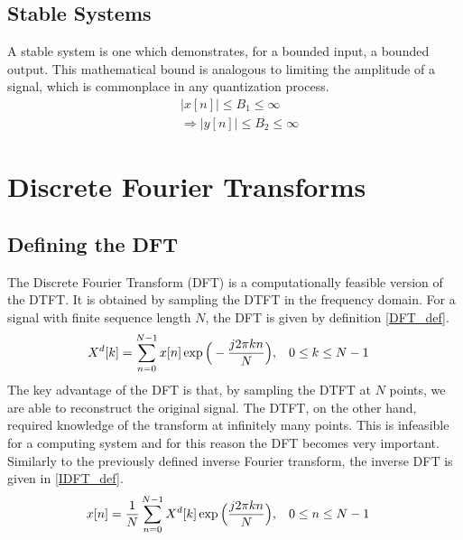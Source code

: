 \subsection{Stable Systems}
A stable system is one which demonstrates, for a bounded input, a bounded output. This mathematical bound is analogous to limiting the amplitude of a signal, which is commonplace in any quantization process.
\begin{align*}
& |x[n]| \leq B_1 \leq \infty \\
&\Longrightarrow |y[n]| \leq B_2 \leq \infty
\end{align*}


\section{Discrete Fourier Transforms}
\subsection{Defining the DFT}
The Discrete Fourier Transform (DFT) is a computationally feasible version of the DTFT. It is obtained by sampling the DTFT in the frequency domain. For a signal with finite sequence length $N$, the DFT is given by definition \ref{DFT_def}.
\begin{align}\label{DFT_def}
    X^d[k]  &= \sum_{n=0}^{N-1}x[n]\exp{\Big( -\dfrac{j2\pi kn}{N} \Big)}, \hspace{3mm} 0\leq k \leq N-1
\end{align}
The key advantage of the DFT is that, by sampling the DTFT at $N$ points, we are able to reconstruct the original signal. The DTFT, on the other hand, required knowledge of the transform at infinitely many points. This is infeasible for a computing system and for this reason the DFT becomes very important. Similarly to the previously defined inverse Fourier transform, the inverse DFT is given in \ref{IDFT_def}.
\begin{align}\label{IDFT_def}
    x[n]  &= \dfrac{1}{N} \sum_{n=0}^{N-1}X^d[k]\exp{\Big( \dfrac{j2\pi kn}{N} \Big)}, \hspace{3mm} 0\leq n \leq N-1
\end{align}
